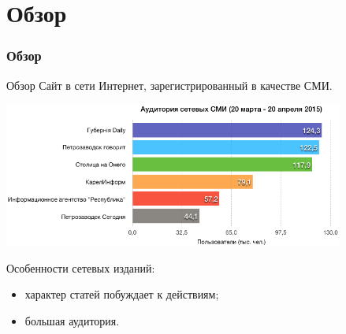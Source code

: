 \section{Обзор}
\begin{frame}
\frametitle{Обзор}

\begin{block}{Обзор}
Сайт в сети Интернет, зарегистрированный в качестве СМИ.
\end{block}
\includegraphics[width=0.84\textwidth]{images/usersSMI}

Особенности сетевых изданий:
\begin{itemize}
  \item характер статей побуждает к действиям;
  \item большая аудитория.
\end{itemize}
\end{frame}